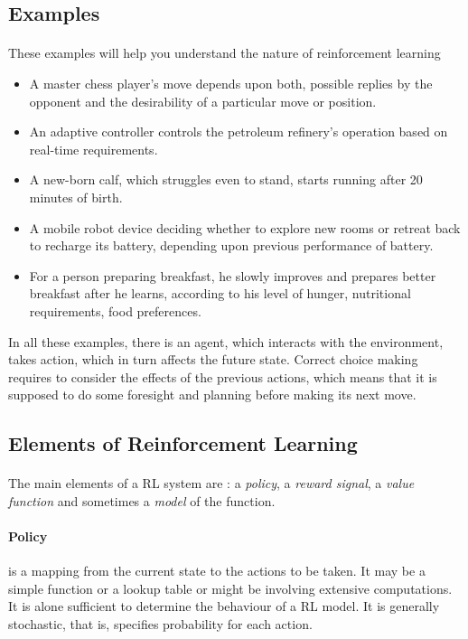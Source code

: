 \documentclass{article}
\begin{document}
  \subsection{Examples}
    \paragraph{} These examples will help you understand the nature of reinforcement learning
    \begin{itemize}
      \item A master chess player’s move depends upon both, possible replies by the opponent and the desirability of a particular move or position.
      \item An adaptive controller controls the petroleum refinery’s operation based on real-time requirements.
      \item A new-born calf, which struggles even to stand, starts running after 20 minutes of birth.
      \item A mobile robot device deciding whether to explore new rooms or retreat back to recharge its battery, depending upon previous performance of battery.
      \item For a person preparing breakfast, he slowly improves and prepares better breakfast after he learns, according to his level of hunger, nutritional requirements, food preferences.
    \end{itemize}
    In all these examples, there is an agent, which interacts with the environment, takes action, which in turn affects the future state. Correct choice making requires to consider the effects of the previous actions, which means that it is supposed to do some foresight and planning before making its next move.
  
  \subsection{Elements of Reinforcement Learning}
    \paragraph{} The main elements of a RL system are :  a \textit{policy}, a \textit{reward signal}, a \textit{value function} and sometimes a \textit{model} of the function.
    \paragraph{Policy} is a mapping from the current state to the actions to be taken. It may be a simple function or a lookup table or might be involving extensive computations. It is alone sufficient to determine the behaviour of a RL model. It is generally stochastic, that is, specifies probability for each action.
\end{document}
